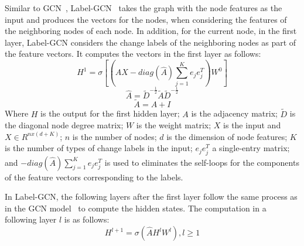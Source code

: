 Similar to GCN~\cite{gcn}, Label-GCN~\cite{label-gcn} takes the graph
with the node features as the input and produces the vectors for the
nodes, when considering the features of the neighboring nodes of each
node.  In addition, for the current node, in the first layer,
Label-GCN considers the change labels of the neighboring nodes as part
of the feature vectors.
It computes the vectors in the first layer as follows:
\begin{equation}\label{eq1}
	H^1 = \sigma [(\hat{A}X-diag(\hat{A})\sum_{j=1}^{K}e_je^T_j)W^0]
\end{equation}
\begin{equation}\label{eq2}
	\hat{A} = \tilde{D}^{-\frac{1}{2}}\tilde{A}\tilde{D}^{-\frac{1}{2}}
\end{equation}
\begin{equation}\label{eq3}
	\tilde{A} = A + I
\end{equation}
Where $H$ is the output for the first hidden layer; $A$ is the
adjacency matrix; $\tilde{D}$ is the diagonal node degree matrix; $W$
is the weight matrix; $X$ is the input and $X \in R^{nx(d+K)}$; $n$ is
the number of nodes; $d$ is the dimension of node features; $K$ is the
number of types of change labels in the input; $e_je^T_j$ a single-entry
matrix; and $-diag(\hat{A})\sum_{j=1}^{K}e_je^T_j$ is used to
eliminates the self-loops for the components of the feature vectors
corresponding to the labels.


In Label-GCN, the following layers after the first layer follow the
same process as in the GCN model~\cite{gcn} to compute the hidden
states. The computation in a following layer $l$ is as follows:
\begin{equation}\label{eq4}
	H^{l+1} = \sigma (\hat{A}H^lW^l), l \geq 1
\end{equation}

